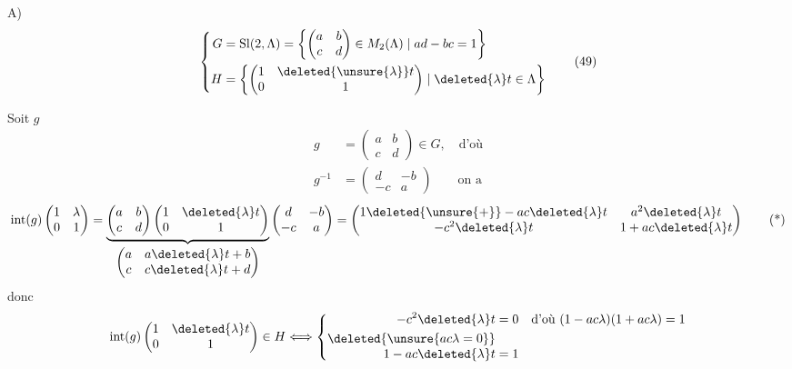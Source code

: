 A)
\[
\left\{\begin{aligned}
G&=\mathrm{Sl}(2,\Lambda)=\left\{\begin{pmatrix}a&b\\c&d\end{pmatrix}\in M_2(\Lambda)\mid ad-bc=1\right\}\\
H&=\left\{\begin{pmatrix}1&\deleted{\unsure{\lambda}}t\\0&1\end{pmatrix}\mid\deleted{\lambda}t\in\Lambda\right\}
\end{aligned}\right.\tag*{(49)}
\]

Soit $g$
\[
\begin{aligned}
g&=\begin{pmatrix}a&b\\c&d\end{pmatrix}\in G,\quad\text{d'où}\\
g^{-1}&=\begin{pmatrix}d&-b\\-c&a\end{pmatrix}\qquad\text{on a}
\end{aligned}
\]
\[
\operatorname{int}(g)\begin{pmatrix}1&\lambda\\0&1\end{pmatrix}=
\underbrace{\begin{pmatrix}a&b\\c&d\end{pmatrix}\begin{pmatrix}1&\deleted{\lambda}t\\0&1\end{pmatrix}}_{\begin{pmatrix}a&a\deleted{\lambda}t+b\\c&c\deleted{\lambda}t+d\end{pmatrix}}
\begin{pmatrix}d&-b\\-c&a\end{pmatrix}=
\begin{pmatrix}1\deleted{\unsure{+}}-ac\deleted{\lambda}t&a^2\deleted{\lambda}t\\-c^2\deleted{\lambda}t&1+ac\deleted{\lambda}t\end{pmatrix}\tag*{(*)}
\]
donc
\[
\operatorname{int}(g)\begin{pmatrix}1&\deleted{\lambda}t\\0&1\end{pmatrix}\in H
\Longleftrightarrow\left\{\begin{aligned}
-c^2\deleted{\lambda}t&=0\quad\text{d'où }(1-ac\lambda)(1+ac\lambda)=1\\
\deleted{\unsure{ac\lambda=0}}\\[-3pt]
1-ac\deleted{\lambda}t&=1
\end{aligned}\right.
\]

